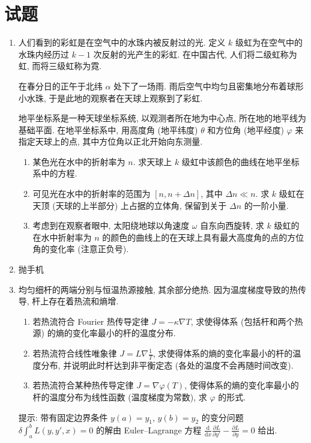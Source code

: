 \documentclass{article}
\begin{document}
\section*{试题}

\begin{enumerate}

\item
人们看到的彩虹是在空气中的水珠内被反射过的光.
定义 $k$ 级虹为在空气中的水珠内经历过 $k-1$ 次反射的光产生的彩虹.
在中国古代, 人们将二级虹称为虹, 而将三级虹称为霓.

在春分日的正午于北纬 $\alpha$ 处下了一场雨.
雨后空气中均匀且密集地分布着球形小水珠, 于是此地的观察者在天球上观察到了彩虹.

地平坐标系是一种天球坐标系统, 以观测者所在地为中心点, 所在地的地平线为基础平面.
在地平坐标系中, 用高度角 (地平纬度) $\theta$ 和方位角 (地平经度) $\varphi$ 来指定天球上的点,
其中方位角以正北开始向东测量.

\begin{enumerate}

	\item
	某色光在水中的折射率为 $n$.
	求天球上 $k$ 级虹中该颜色的曲线在地平坐标系中的方程.

	\item
	可见光在水中的折射率的范围为 $\left[n,n+\Delta n\right]$, 其中 $\Delta n\ll n$.
	求 $k$ 级虹在天顶 (天球的上半部分) 上占据的立体角, 保留到关于 $\Delta n$ 的一阶小量.

	\item
	考虑到在观察者眼中, 太阳绕地球以角速度 $\omega$ 自东向西旋转,
	求 $k$ 级虹的在水中折射率为 $n$ 的颜色的曲线上的在天球上具有最大高度角的点的方位角的变化率 (注意正负号).
\end{enumerate}

\item
抛手机

\item
均匀细杆的两端分别与恒温热源接触, 其余部分绝热.
因为温度梯度导致的热传导, 杆上存在着热流和熵增.

\begin{enumerate}

	\item
	若热流符合 Fourier 热传导定律 $J=-\kappa\nabla T$, 求使得体系 (包括杆和两个热源) 的熵的变化率最小的杆的温度分布.

	\item
	若热流符合线性唯象律 $J=L\nabla\frac1T$, 求使得体系的熵的变化率最小的杆的温度分布, 并说明此时杆达到非平衡定态 (各处的温度不会再随时间改变).

	\item
	若热流符合某种热传导定律 $J=\nabla\varphi\left(T\right)$, 使得体系的熵的变化率最小的杆的温度分布为线性函数 (温度梯度为常数), 求 $\varphi$ 的形式.

\end{enumerate}

提示: 带有固定边界条件 $y\left(a\right)=y_1$, $y\left(b\right)=y_2$ 的变分问题 $\delta\int_a^bL\left(y,y',x\right)=0$ 的解由 Euler--Lagrange 方程 $\frac{\mathrm d}{\mathrm dx}\frac{\partial L}{\partial y'}-\frac{\partial L}{\partial y}=0$ 给出.

\end{enumerate}
\end{document}
